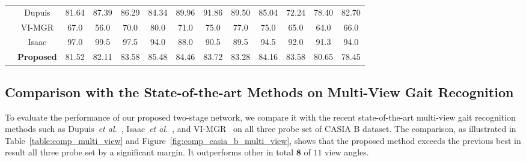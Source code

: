 \begin{table}
{\begin{tabular*}{\textwidth}{|c|c|cccc cccc ccc|}
		\multirow{4}{*}{\rotatebox{90}{Coat}} &Dupuis &81.64 &87.39 &86.29 &84.34 &89.96 &91.86 &89.50 &85.04 &72.24 &78.40 &82.70\\\rule{0pt}{3ex}
		
		&VI-MGR &67.0 &56.0 &70.0 &80.0 &71.0 &75.0 &77.0 &75.0 &65.0 &64.0 &66.0 \\\rule{0pt}{3ex}
		
		&Isaac &97.0 &99.5 &97.5 &94.0 &88.0 &90.5 &89.5 &94.5 &92.0 &91.3 &94.0 \\\rule{0pt}{3ex}
		
		&\textbf{Proposed} &81.52 &82.11 &83.58 &85.48 &84.46 &83.72 &83.28 &84.16 &83.58 &80.65 &78.45 \\\cline{1-13}
\end{tabular*}}{} 
\end{table}


\subsection{Comparison with the State-of-the-art Methods on Multi-View Gait Recognition}
To evaluate the performance of our proposed two-stage network, we compare it with the recent state-of-the-art multi-view gait recognition methods such as Dupuis~\textit{et al.}~\cite{Dupuis_13}, Isaac~\textit{et al.}~\cite{Isaac_17}, and VI-MGR~\cite{Choudhury_15} on all three probe set of CASIA B dataset. The comparison, as illustrated in Table~\ref{table:comp_multi_view} and Figure~\ref{fig:comp_casia_b_multi_view}, shows that the proposed method exceeds the previous best in result all three probe set by a significant margin. It outperforms other in total $ \textbf{8} $ of $ 11 $ view angles.

